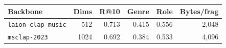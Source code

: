 \begin{tabular}{lrrrrr}
\toprule
Backbone & Dims & R@10 & Genre & Role & Bytes/frag \\
\midrule
\texttt{laion-clap-music} & 512 & 0.713 & 0.415 & 0.556 & 2,048 \\
\texttt{msclap-2023} & 1024 & 0.692 & 0.384 & 0.533 & 4,096 \\
\bottomrule
\end{tabular}
